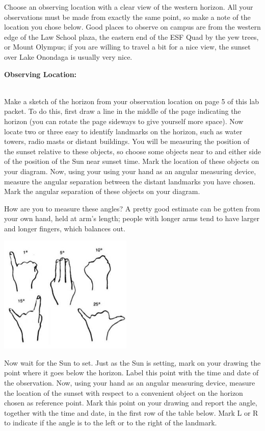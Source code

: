 \documentclass[11pt]{article}
\begin{document}
Choose an observing location with a clear view of the western horizon. All
your observations must be made from exactly the same point, so make a note of
the location you chose below.  Good places to observe on campus are from the
western edge of the Law School plaza, the eastern end of the ESF Quad by the yew trees,
or Mount Olympus; if you are willing to
travel a bit for a nice view, the sunset over Lake Onondaga is usually very nice.

\noindent \textbf{Observing Location:}
\vspace*{0.5cm}

\hrulefill\\
Make a sketch of the horizon from your observation location on page 5 of
this lab packet. To do this, first draw a line in the middle of the page
indicating the horizon (you can rotate the page sideways to give yourself more
space). Now locate two or three easy to identify landmarks on the horizon,
such as water towers, radio masts or distant buildings. You will be measuring
the position of the sunset relative to these objects, so choose some objects
near to and either side of the position of the Sun near sunset time. Mark the
location of these objects on your diagram. Now, using your using your hand as
an angular measuring device, measure the angular separation between the 
distant landmarks you have chosen. Mark the angular separation of these
objects on your diagram.

How are you to measure these angles? A pretty good estimate can be gotten from
your own hand, held at arm's length; people with longer arms tend to have larger 
and longer fingers, which balances out.

\begin{center}\includegraphics[width=2.5in]{Sky_Angles.jpg}\end{center}

Now wait for the Sun to set. Just as the Sun is setting, mark on your drawing
the point where it goes below the horizon. Label this point with the time and
date of the observation.  Now, using your hand as an angular measuring device,
measure the location of the sunset with respect to a convenient object on the
horizon chosen as reference point. Mark this point on your drawing and report
the angle, together with the time and date, in the first row of the table
below. Mark L or R to indicate if the angle is to the left or to the right of
the landmark.
\end{document}
